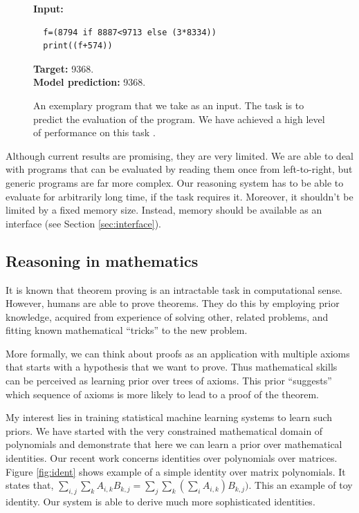 \documentclass{article}
\begin{document}
\begin{figure}
  \begin{code}
  \begin{mdframed}
  {\bf Input:}
  \begin{lstlisting}
  f=(8794 if 8887<9713 else (3*8334))
  print((f+574))
  \end{lstlisting} 
  {\bf Target:} 9368. \\
  {\bf Model prediction:} 9368. 
  \end{mdframed}
  \end{code}
  \caption{An exemplary program that we take as an input. The task is
    to predict the evaluation of the program. We have 
  achieved a high level of performance on this task \cite{zaremba2014execute}.}
  \label{fig:prog}
\end{figure}


Although current results are promising, they are very limited. We are able to deal with programs
that can be evaluated by reading them once from left-to-right, but
generic programs are far more complex. Our reasoning system has to be
able to evaluate for arbitrarily long time, if the
task requires it. Moreover, it shouldn't be limited by a fixed memory
size. Instead, memory should be available
as an interface (see Section \ref{sec:interface}).


\subsection{Reasoning in mathematics}
It is known that theorem proving is an intractable task in computational sense. 
However, humans are able to prove theorems. They do this by employing prior
knowledge, acquired from experience of solving other, related
problems, and fitting known mathematical ``tricks'' to the new problem.

More formally, we can think about proofs as an application with
multiple axioms that starts with a 
hypothesis that we want to prove. Thus mathematical skills can be perceived as 
learning prior over trees of axioms. This prior ``suggests'' which sequence of axioms is more
likely to lead to a proof of the theorem. 


My interest lies in training statistical machine learning systems to learn such priors. 
We have started with the very constrained mathematical domain of
polynomials and demonstrate that here we can learn a prior over mathematical identities. 
Our recent work \cite{zaremba2014learning} concerns identities 
over polynomials over matrices. Figure \ref{fig:ident} shows example of a simple identity
over matrix polynomials. It states that, $\sum_{i,j} \sum_k A_{i, k}B_{k, j} = 
\sum_{j} \sum_k (\sum_i A_{i, k})B_{k, j})$. This an example of toy identity. Our system is able
to derive much more sophisticated identities.
\end{document}
